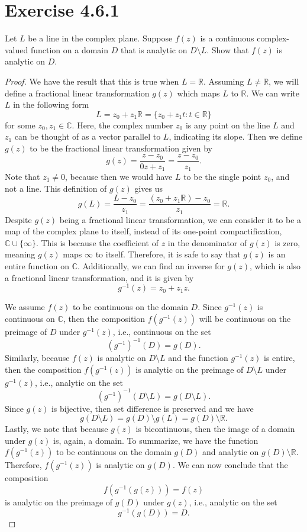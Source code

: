 \documentclass[12pt]{article}
\newenvironment{problem}
    {\begin{lrbox}{\mybox}\begin{minipage}{0.98\textwidth}}
    {\end{minipage}\end{lrbox}\framebox[\textwidth]{\usebox{\mybox}}}
\newcommand{\R}{\mathbb{R}} %
\newcommand{\C}{\mathbb{C}} %
\newcommand{\<}{\left\langle} %
\renewcommand{\>}{\right\rangle} %
\begin{document}
\section{Exercise 4.6.1}
\begin{problem}
    Let $L$ be a line in the complex plane. Suppose $f(z)$ is a continuous complex-valued function on a domain $D$ that is analytic on $D \setminus L$. Show that $f(z)$ is analytic on $D$.
\end{problem}

\begin{proof}
    We have the result that this is true when $L = \R$. Assuming $L \ne \R$, we will define a fractional linear transformation $g(z)$ which maps $L$ to $\R$. We can write $L$ in the following form
    \[
        L = z_0 + z_1\R = \{z_0 + z_1t : t \in \R\}
    \]
    for some $z_0, z_1 \in \C$. Here, the complex number $z_0$ is any point on the line $L$ and $z_1$ can be thought of as a vector parallel to $L$, indicating its slope. Then we define $g(z)$ to be the fractional linear transformation given by
    \[
        g(z) = \frac{z - z_0}{0z + z_1} = \frac{z - z_0}{z_1}.
    \]
    Note that $z_1 \ne 0$, because then we would have $L$ to be the single point $z_0$, and not a line. This definition of $g(z)$ gives us
    \[
        g(L) = \frac{L - z_0}{z_1} = \frac{(z_0 + z_1\R) - z_0}{z_1} = \R.
    \]
    Despite $g(z)$ being a fractional linear transformation, we can consider it to be a map of the complex plane to itself, instead of its one-point compactification, $\C \cup \{\infty\}$. This is because the coefficient of $z$ in the denominator of $g(z)$ is zero, meaning $g(z)$ maps $\infty$ to itself. Therefore, it is safe to say that $g(z)$ is an entire function on $\C$. Additionally, we can find an inverse for $g(z)$, which is also a fractional linear transformation, and it is given by
    \[
        g^{-1}(z) = z_0 + z_1z.
    \]
    
    We assume $f(z)$ to be continuous on the domain $D$. Since $g^{-1}(z)$ is continuous on $\C$, then the composition $f(g^{-1}(z))$ will be continuous on the preimage of $D$ under $g^{-1}(z)$, i.e., continuous on the set
    \[
        (g^{-1})^{-1}(D) = g(D).
    \]
    Similarly, because $f(z)$ is analytic on $D \setminus L$ and the function $g^{-1}(z)$ is entire, then the composition $f(g^{-1}(z))$ is analytic on the preimage of $D \setminus L$ under $g^{-1}(z)$, i.e., analytic on the set
    \[
        (g^{-1})^{-1}(D \setminus L) = g(D \setminus L).
    \]
    Since $g(z)$ is bijective, then set difference is preserved and we have
    \[
        g(D \setminus L) = g(D) \setminus g(L) = g(D) \setminus \R.
    \]
    Lastly, we note that because $g(z)$ is bicontinuous, then the image of a domain under $g(z)$ is, again, a domain. To summarize, we have the function $f(g^{-1}(z))$ to be continuous on the domain $g(D)$ and analytic on $g(D) \setminus \R$. Therefore, $f(g^{-1}(z))$ is analytic on $g(D)$. We can now conclude that the composition
    \[
        f(g^{-1}(g(z))) = f(z)
    \]
    is analytic on the preimage of $g(D)$ under $g(z)$, i.e., analytic on the set
    \[
        g^{-1}(g(D)) = D.
    \]
    
\end{proof}
\end{document}
